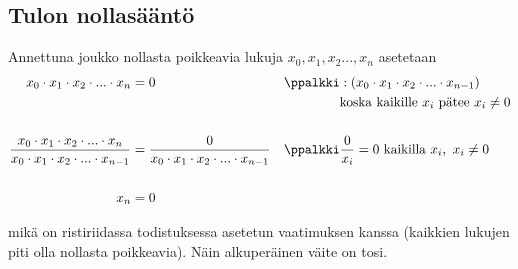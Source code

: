 \subsection*{Tulon nollasääntö}
\label{tod:tulonolla}

\begin{todistus}
Annettuna joukko nollasta poikkeavia lukuja $x_0, x_1, x_2 ... , x_n$ asetetaan
\begin{align*}
    x_0 \cdot x_1 \cdot x_2 \cdot ... \cdot x_n &= 0 & \ppalkki & : (x_0 \cdot x_1 \cdot x_2 \cdot ... \cdot x_{n-1}) \\
    & & & \text{koska kaikille $x_i$ pätee $x_i \neq 0$} \\
    \\
    \frac{x_0 \cdot x_1 \cdot x_2 \cdot ... \cdot x_n}{x_0 \cdot x_1 \cdot x_2 \cdot ... \cdot x_{n-1}} &=
    \frac{0}{x_0 \cdot x_1 \cdot x_2 \cdot ... \cdot x_{n-1}} & \ppalkki & \frac{0}{x_i} = 0\ \text{kaikilla $x_i,\ x_i \neq 0$} \\
    \\
    x_n &= 0 & &
\end{align*}

mikä on ristiriidassa todistuksessa asetetun vaatimuksen kanssa (kaikkien
lukujen piti olla nollasta poikkeavia). Näin alkuperäinen väite on tosi.

\end{todistus}